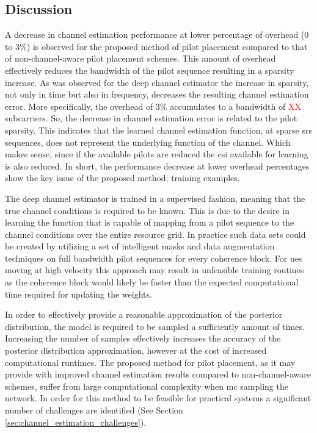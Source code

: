 \subsection{Discussion}
A decrease in channel estimation performance at lower percentage of overhead ($0$ to $3\%$) is observed for the proposed method of pilot placement compared to that of non-channel-aware pilot placement schemes. This amount of overhead effectively reduces the bandwidth of the pilot sequence resulting in a sparsity increase. As was observed for the deep channel estimator the increase in sparsity, not only in time but also in frequency, decreases the resulting channel estimation error. More specifically, the overhead of $3\%$ accumulates to a bandwidth of \textcolor{red}{XX} subcarriers. So, the decrease in channel estimation error is related to the pilot sparsity. This indicates that the learned channel estimation function, at sparse \gls{srs} sequences, does not represent the underlying function of the channel. Which makes sense, since if the available pilots are reduced the \gls{csi} available for learning is also reduced. In short, the performance decrease at lower overhead percentages show the key issue of the proposed method; training examples.

The deep channel estimator is trained in a supervised fashion, meaning that the true channel conditions is required to be known. This is due to the desire in learning the function that is capable of mapping from a pilot sequence to the channel conditions over the entire resource grid. In practice such data sets could be created by utilizing a set of intelligent masks and data augmentation techniques on full bandwidth pilot sequences for every coherence block. For \glspl{ue} moving at high velocity this approach may result in unfeasible training routines as the coherence block would likely be faster than the expected computational time required for updating the weights.

In order to effectively provide a reasonable approximation of the posterior distribution, the model is required to be sampled a sufficiently amount of times. Increasing the number of samples effectively increases the accuracy of the posterior distribution approximation, however at the cost of increased computational runtimes. The proposed method for pilot placement, as it may provide with improved channel estimation results compared to non-channel-aware schemes, suffer from large computational complexity when \gls{mc} sampling the network. In order for this method to be feasible for practical systems a significant number of challenges are identified (See Section \ref{sec:channel_estimation_challenges}). 

